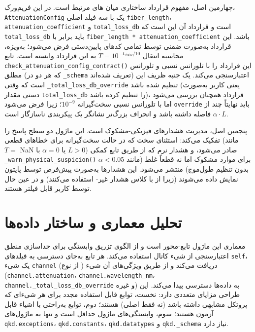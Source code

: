چهارمین اصل، مفهوم قرارداد ساختاری  میان های مرتبط است. در این فریم‌ورک، \texttt{AttenuationConfig} یک  با سه فیلد اصلی \texttt{fiber\_length}، \texttt{attenuation\_coefficient} و \texttt{total\_loss\_db} است و قرارداد آن این است که \texttt{total\_loss\_db} باید برابر با \texttt{fiber\_length * attenuation\_coefficient} باشد. این قرارداد به‌صورت ضمنی توسط تمامی کدهای پایین‌دستی فرض می‌شود؛ به‌ویژه، محاسبه انتقال $T = 10^{-L_{total}/10}$ به این قرارداد وابسته است. تابع \texttt{check\_attenuation\_config\_contract()} این قرارداد را با تلورانس نسبی  و تلورانس مطلق  (که هر دو در \texttt{\_schema} تعریف شده‌اند) اعتبارسنجی می‌کند. یک جنبه ظریف این است که وقتی \texttt{\_total\_loss\_db\_override} تنظیم شده باشد (یعنی کاربر به‌صورت دستی مقدار \texttt{total\_loss\_db} را تنظیم کرده باشد)، قرارداد همچنان بررسی می‌شود اما با تلورانس نسبی سخت‌گیرانه $10^{-9}$؛ زیرا فرض می‌شود \texttt{override} باید نهایتاً چند  از $\alpha \cdot L$ فاصله داشته باشد و انحراف بزرگ‌تر نشانگر یک پیکربندی ناسازگار است.

پنجمین اصل، مدیریت هشدارهای فیزیکی-مشکوک  است. این ماژول دو سطح پاسخ را تفکیک می‌کند: استثنای سخت  که در حالت سخت‌گیرانه برای خطاهای قطعی (مانند $T = $ NaN یا $\alpha = 0$ با $L > 0$) صادر می‌شود، و هشدار نرم  که از طریق تابع کمکی \texttt{\_warn\_physical\_suspicion()} برای موارد مشکوک اما نه قطعاً غلط (مانند $\alpha < 0.05$ بدون تنظیم طول‌موج) منتشر می‌شود. این هشدارها به‌صورت پیش‌فرض توسط پایتون نمایش داده می‌شوند (زیرا از  با کلاس هشدار غیر- استفاده می‌کنند) و در عین حال توسط کاربر قابل فیلتر هستند.

\section{تحلیل معماری و ساختار داده‌ها}

معماری این ماژول تابع-محور  است و از الگوی تزریق وابستگی  برای جداسازی منطق اعتبارسنجی از شیء کانال استفاده می‌کند. هر تابع به‌جای دسترسی به فیلدهای \texttt{self}، یک شیء \texttt{channel} (از نوع ) دریافت می‌کند و از طریق ویژگی‌های آن شیء (\texttt{channel.attenuation}، \texttt{channel.wavelength\_nm}، \texttt{channel.\_total\_loss\_db\_override} و غیره) به داده‌ها دسترسی پیدا می‌کند. این طراحی مزایای متعددی دارد: نخست، توابع قابل استفاده مجدد برای هر شیء‌ای که پروتکل  مشابهی داشته باشد (نه فقط  اصلی) هستند؛ دوم، توابع به‌راحتی با اشیاء  قابل آزمون هستند؛ سوم، وابستگی‌های ماژول حداقل است و تنها به ماژول‌های \texttt{qkd.exceptions}، \texttt{qkd.constants}، \texttt{qkd.datatypes} و \texttt{qkd.\_schema} نیاز دارد.

